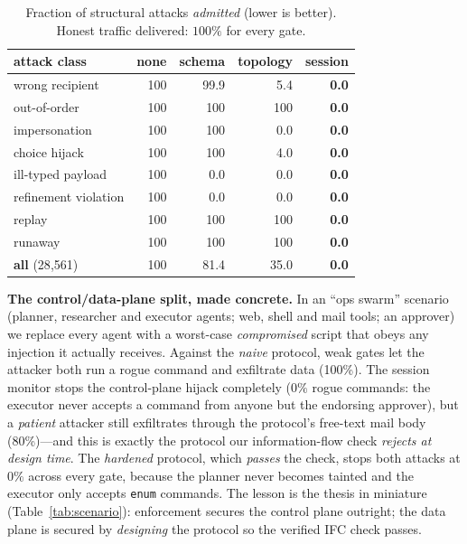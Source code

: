 \documentclass[10pt,twocolumn]{article}
\newcommand{\code}[1]{\texttt{\small #1}}
\begin{document}
\begin{table}[t]\centering\small
\caption{Fraction of structural attacks \emph{admitted} (lower is better). Honest traffic delivered:
$100\%$ for every gate.}
\label{tab:struct}
\begin{tabular}{lrrrr}
\toprule
attack class & none & schema & topology & \textbf{session} \\
\midrule
wrong recipient      & 100 & 99.9 & 5.4 & \textbf{0.0}\\
out-of-order         & 100 & 100  & 100 & \textbf{0.0}\\
impersonation        & 100 & 100  & 0.0 & \textbf{0.0}\\
choice hijack        & 100 & 100  & 4.0 & \textbf{0.0}\\
ill-typed payload    & 100 & 0.0  & 0.0 & \textbf{0.0}\\
refinement violation & 100 & 0.0  & 0.0 & \textbf{0.0}\\
replay               & 100 & 100  & 100 & \textbf{0.0}\\
runaway              & 100 & 100  & 100 & \textbf{0.0}\\
\midrule
\textbf{all} (28{,}561) & 100 & 81.4 & 35.0 & \textbf{0.0}\\
\bottomrule
\end{tabular}
\vspace{-1ex}
\end{table}

\textbf{The control/data-plane split, made concrete.} In an ``ops swarm'' scenario (planner, researcher and
executor agents; web, shell and mail tools; an approver) we replace every agent with a worst-case
\emph{compromised} script that obeys any injection it actually receives. Against the \emph{naive} protocol,
weak gates let the attacker both run a rogue command and exfiltrate data (100\%). The session monitor stops
the control-plane hijack completely ($0\%$ rogue commands: the executor never accepts a command from
anyone but the endorsing approver), but a \emph{patient} attacker still exfiltrates through the protocol's
free-text mail body (80\%)---and this is exactly the protocol our information-flow check \emph{rejects at
design time}. The \emph{hardened} protocol, which \emph{passes} the check, stops both attacks at $0\%$
across every gate, because the planner never becomes tainted and the executor only accepts \code{enum}
commands. The lesson is the thesis in miniature (Table~\ref{tab:scenario}): enforcement secures the control
plane outright; the data plane is secured by \emph{designing} the protocol so the verified IFC check passes.
\end{document}
